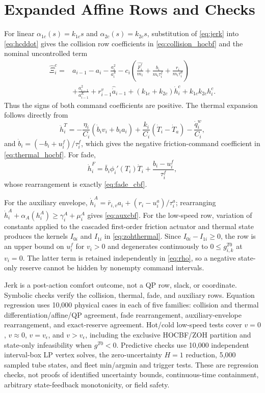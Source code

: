 \appendices
\section{Expanded Affine Rows and Checks}
For linear $\alpha_{1c}(s)=k_{1c}s$ and $\alpha_{2c}(s)=k_{2c}s$, substitution of \eqref{eq:jerk} into \eqref{eq:hcddot} gives the collision row coefficients in \eqref{eq:collision_hocbf} and the nominal uncontrolled term
\begin{align}
\widehat\Xi_i^c={}&a_{i-1}-a_i-\frac{a_i^2}{a_i^S}
-c_i\!\left(\frac{\widehat{\dot F_i^r}}{m_i}+\frac{b_i}{m_i\tau_i^f}+\frac{r_i}{m_i\tau_i^a}\right)\nonumber\\
&+\frac{a_{i-1}^2}{a_{i-1}^E}+r_{i-1}^v\widehat{\dot a}_{i-1}
+(k_{1c}+k_{2c})\dot h_i^c+k_{1c}k_{2c}h_i^c.
\end{align}
Thus the signs of both command coefficients are positive. The thermal expansion follows directly from
\begin{equation}
\ddot h_i^T=-\frac{\eta_i}{C_i}(\dot b_iv_i+b_ia_i)
+\frac{k_i}{C_i}(\dot T_i-\dot T_a)-\frac{\dot q_i^w}{C_i},
\end{equation}
and $\dot b_i=(-b_i+u_i^f)/\tau_i^f$, which gives the negative friction-command coefficient in \eqref{eq:thermal_hocbf}. For fade,
\begin{equation}
\dot h_i^F=\bar b_i\phi_i'(T_i)\dot T_i+\frac{b_i-u_i^f}{\tau_i^f},
\end{equation}
whose rearrangement is exactly \eqref{eq:fade_cbf}.

For the auxiliary envelope, $\dot h_i^A=\bar r_{i,v}a_i+(r_i-u_i^a)/\tau_i^a$; rearranging $\dot h_i^A+\alpha_A(h_i^A)\ge\gamma_i^A+\mu_i^A$ gives \eqref{eq:auxcbf}. For the low-speed row, variation of constants applied to the cascaded first-order friction actuator and thermal state produces the kernels $I_{0i}$ and $I_{1i}$ in \eqref{eq:zohthermal}. Since $I_{0i}-I_{1i}\ge0$, the row is an upper bound on $u_i^f$ for $v_i>0$ and degenerates continuously to $0\le g_{i,k}^{T0}$ at $v_i=0$. The latter term is retained independently in \eqref{eq:rho}, so a negative state-only reserve cannot be hidden by nonempty command intervals.

Jerk is a post-action comfort outcome, not a QP row, slack, or coordinate. Symbolic checks verify the collision, thermal, fade, and auxiliary rows. Equation regression uses 10,000 physical cases in each of five families: collision and thermal differentiation/affine/QP agreement, fade rearrangement, auxiliary-envelope rearrangement, and exact-reserve agreement. Hot/cold low-speed tests cover $v=0$, $v\approx0$, $v=v_\epsilon$, and $v>v_\epsilon$, including the exclusive HOCBF/ZOH partition and state-only infeasibility when $g^{T0}<0$. Predictive checks use 10,000 independent interval-box LP vertex solves, the zero-uncertainty $H=1$ reduction, 5,000 sampled tube states, and fleet min/argmin and trigger tests. These are regression checks, not proofs of identified uncertainty bounds, continuous-time containment, arbitrary state-feedback monotonicity, or field safety.
